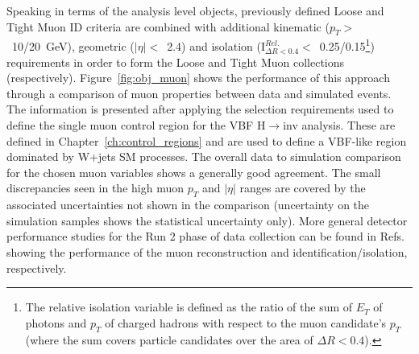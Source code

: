 \hspace{10pt} Speaking in terms of the analysis level objects, previously defined Loose and Tight Muon ID criteria are combined with additional kinematic ($p_T>$~10/20~GeV), geometric ($|\eta|<$~2.4) and isolation ($\text{I}_{\Delta R<0.4}^{Rel.}<$~0.25/0.15\footnote{The relative isolation variable is defined as the ratio of the sum of $E_T$ of photons and $p_T$ of charged hadrons with respect to the muon candidate's $p_T$ (where the sum covers particle candidates over the area of $\Delta R<0.4$).}) requirements in order to form the Loose and Tight Muon collections (respectively). Figure~\ref{fig:obj_muon} shows the performance of this approach through a comparison of muon properties between data and simulated events. The information is presented after applying the selection requirements used to define the single muon control region for the VBF H$\rightarrow$inv analysis. These are defined in Chapter~\ref{ch:control_regions} and are used to define a VBF-like region dominated by W+jets SM processes. The overall data to simulation comparison for the chosen muon variables shows a generally good agreement. The small discrepancies seen in the high muon $p_{T}$ and $|\eta|$ ranges are covered by the associated uncertainties not shown in the comparison (uncertainty on the simulation samples shows the statistical uncertainty only). More general detector performance studies for the Run 2 phase of data collection can be found in Refs.~\cite{dps:muon_id,dps:muon_rec} showing the performance of the muon reconstruction and identification/isolation, respectively.
